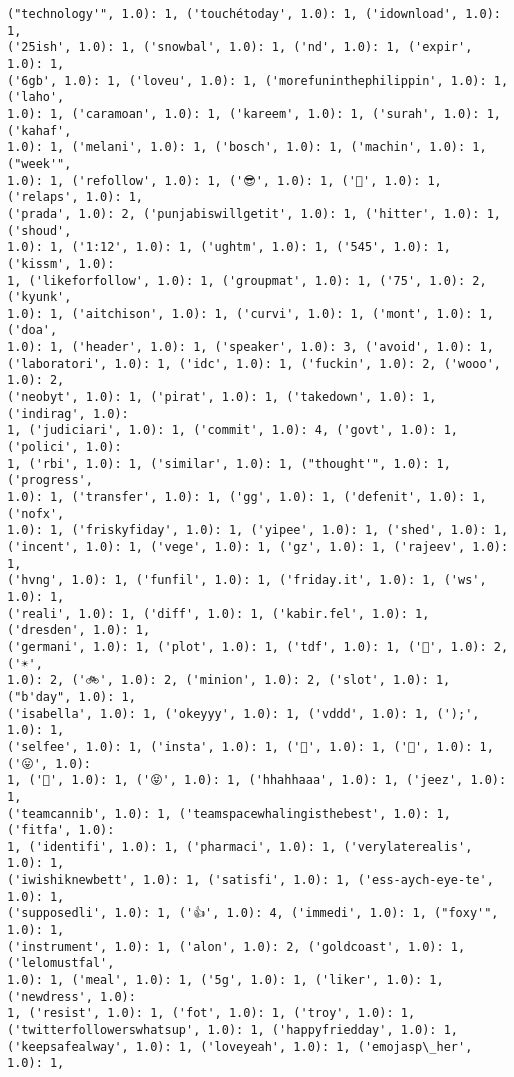 \documentclass[11pt]{article}
\begin{document}
\begin{Verbatim}[commandchars=\\\{\}]
("technology'", 1.0): 1, ('touchétoday', 1.0): 1, ('idownload', 1.0): 1,
('25ish', 1.0): 1, ('snowbal', 1.0): 1, ('nd', 1.0): 1, ('expir', 1.0): 1,
('6gb', 1.0): 1, ('loveu', 1.0): 1, ('morefuninthephilippin', 1.0): 1, ('laho',
1.0): 1, ('caramoan', 1.0): 1, ('kareem', 1.0): 1, ('surah', 1.0): 1, ('kahaf',
1.0): 1, ('melani', 1.0): 1, ('bosch', 1.0): 1, ('machin', 1.0): 1, ("week'",
1.0): 1, ('refollow', 1.0): 1, ('😎', 1.0): 1, ('💁', 1.0): 1, ('relaps', 1.0): 1,
('prada', 1.0): 2, ('punjabiswillgetit', 1.0): 1, ('hitter', 1.0): 1, ('shoud',
1.0): 1, ('1:12', 1.0): 1, ('ughtm', 1.0): 1, ('545', 1.0): 1, ('kissm', 1.0):
1, ('likeforfollow', 1.0): 1, ('groupmat', 1.0): 1, ('75', 1.0): 2, ('kyunk',
1.0): 1, ('aitchison', 1.0): 1, ('curvi', 1.0): 1, ('mont', 1.0): 1, ('doa',
1.0): 1, ('header', 1.0): 1, ('speaker', 1.0): 3, ('avoid', 1.0): 1,
('laboratori', 1.0): 1, ('idc', 1.0): 1, ('fuckin', 1.0): 2, ('wooo', 1.0): 2,
('neobyt', 1.0): 1, ('pirat', 1.0): 1, ('takedown', 1.0): 1, ('indirag', 1.0):
1, ('judiciari', 1.0): 1, ('commit', 1.0): 4, ('govt', 1.0): 1, ('polici', 1.0):
1, ('rbi', 1.0): 1, ('similar', 1.0): 1, ("thought'", 1.0): 1, ('progress',
1.0): 1, ('transfer', 1.0): 1, ('gg', 1.0): 1, ('defenit', 1.0): 1, ('nofx',
1.0): 1, ('friskyfiday', 1.0): 1, ('yipee', 1.0): 1, ('shed', 1.0): 1,
('incent', 1.0): 1, ('vege', 1.0): 1, ('gz', 1.0): 1, ('rajeev', 1.0): 1,
('hvng', 1.0): 1, ('funfil', 1.0): 1, ('friday.it', 1.0): 1, ('ws', 1.0): 1,
('reali', 1.0): 1, ('diff', 1.0): 1, ('kabir.fel', 1.0): 1, ('dresden', 1.0): 1,
('germani', 1.0): 1, ('plot', 1.0): 1, ('tdf', 1.0): 1, ('🍷', 1.0): 2, ('☀',
1.0): 2, ('🚲', 1.0): 2, ('minion', 1.0): 2, ('slot', 1.0): 1, ("b'day", 1.0): 1,
('isabella', 1.0): 1, ('okeyyy', 1.0): 1, ('vddd', 1.0): 1, (');', 1.0): 1,
('selfee', 1.0): 1, ('insta', 1.0): 1, ('🙆', 1.0): 1, ('🙌', 1.0): 1, ('😛', 1.0):
1, ('🐒', 1.0): 1, ('😝', 1.0): 1, ('hhahhaaa', 1.0): 1, ('jeez', 1.0): 1,
('teamcannib', 1.0): 1, ('teamspacewhalingisthebest', 1.0): 1, ('fitfa', 1.0):
1, ('identifi', 1.0): 1, ('pharmaci', 1.0): 1, ('verylaterealis', 1.0): 1,
('iwishiknewbett', 1.0): 1, ('satisfi', 1.0): 1, ('ess-aych-eye-te', 1.0): 1,
('supposedli', 1.0): 1, ('👍', 1.0): 4, ('immedi', 1.0): 1, ("foxy'", 1.0): 1,
('instrument', 1.0): 1, ('alon', 1.0): 2, ('goldcoast', 1.0): 1, ('lelomustfal',
1.0): 1, ('meal', 1.0): 1, ('5g', 1.0): 1, ('liker', 1.0): 1, ('newdress', 1.0):
1, ('resist', 1.0): 1, ('fot', 1.0): 1, ('troy', 1.0): 1,
('twitterfollowerswhatsup', 1.0): 1, ('happyfriedday', 1.0): 1,
('keepsafealway', 1.0): 1, ('loveyeah', 1.0): 1, ('emojasp\_her', 1.0): 1,

\end{Verbatim}
\end{document}
